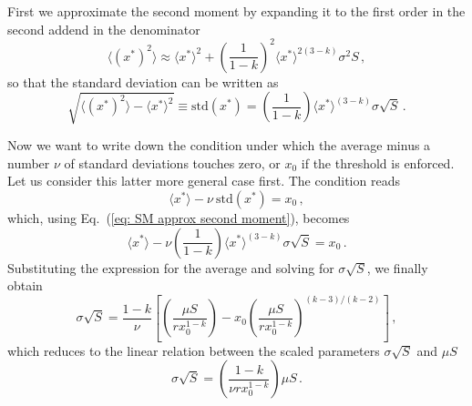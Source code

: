 \documentclass[10pt]{article}
\begin{document}
First we approximate the second moment by expanding it
to the first order in the second addend in the denominator
\begin{equation}
    \langle (x^*)^2 \rangle \approx \langle x^* \rangle^2
    + \left(\frac{1}{1-k}\right)^2\langle x^* \rangle^{2(3-k)}\sigma^2 S \, ,
\end{equation}
so that the standard deviation can be written as
\begin{equation}
    \sqrt{\langle (x^*)^2 \rangle - \langle x^* \rangle^2} \equiv \textrm{std}(x^*)=
    \left(\frac{1}{1-k}\right)\langle x^* \rangle^{(3-k)}\sigma \sqrt{S} \, .
\label{eq: SM approx second moment}
\end{equation}

Now we want to write down the condition under which
the average minus a number $\nu$ of standard deviations
touches zero, or $x_0$ if the threshold is enforced.
Let us consider this latter more general case first.
The condition reads
\begin{equation}
    \langle x^*\rangle - \nu \ \textrm{std}(x^*)
    = x_0 \, ,
\label{eq: SM extinction condition}
\end{equation}
which, using Eq.~(\ref{eq: SM approx second moment}),
becomes
\begin{equation}
    \langle x^*\rangle - \nu\left(\frac{1}{1-k}\right)\langle x^* \rangle^{(3-k)}\sigma \sqrt{S}
    = x_0 \, .
\end{equation}
Substituting the expression for the average and solving for
$\sigma\sqrt{S}$, we finally obtain
\begin{equation}
    \sigma\sqrt{S} = \frac{1-k}{\nu}\left[\left(\frac{ \mu S}{rx_0^{1-k}}\right)
    -x_0\left(\frac{ \mu S}{rx_0^{1-k}}\right)^{(k-3)/(k-2)}\right] \, ,
\end{equation}
which reduces to the linear relation between the scaled parameters
$\sigma\sqrt{S}$ and $\mu S$
\begin{equation}
    \sigma\sqrt{S} = \left(\frac{1-k}{\nu rx_0^{1-k}}\right)\mu S \, .
\end{equation}
\end{document}
